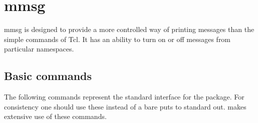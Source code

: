 \section{mmsg}

mmsg is designed to provide a more controlled way of printing messages
than the simple  commands of Tcl. It has an ability to
turn on or off messages from particular namespaces.

\subsection{Basic commands}

The following commands represent the standard interface for the
 package. For consistency one should use these instead
of a bare puts to standard out.  makes extensive use
of these commands.

